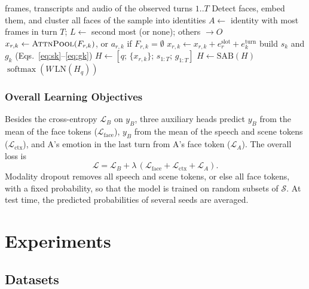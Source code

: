 \documentclass[11pt]{article}
\newcommand{\model}{PartiSet}
\begin{document}
\begin{algorithm}[t]
\caption{\model{} forward pass for one sample}
\label{alg:rolenet}
\small
\begin{algorithmic}[1]
\Require frames, transcripts and audio of the observed turns $1..T$
\State Detect faces, embed them, and cluster all faces of the sample into identities
\State $A \gets$ identity with most frames in turn $T$; $L \gets$ second most (or none); others $\to O$
  \State $x_{r,k} \gets \textsc{AttnPool}(F_{r,k})$, or $a_{r,k}$ if $F_{r,k} = \emptyset$
  \State $x_{r,k} \gets x_{r,k} + e^{\text{slot}}_r + e^{\text{turn}}_k$
\EndFor
{} \State build $s_k$ and $g_k$ (Eqs.~\ref{eq:sk}--\ref{eq:gk}) \EndFor
\State $H \gets [q;\, \{x_{r,k}\};\, s_{1:T};\, g_{1:T}]$
 \State $H \gets \mathrm{SAB}(H)$ \EndFor
\State \Return $\operatorname{softmax}(W\,\mathrm{LN}(H_q))$
\end{algorithmic}
\end{algorithm}

\subsubsection{Overall Learning Objectives}

Besides the cross-entropy $\mathcal{L}_B$ on $y_B$, three auxiliary heads predict $y_B$ from the mean of the face
tokens ($\mathcal{L}_{\text{face}}$), $y_B$ from the mean of the speech and scene tokens ($\mathcal{L}_{\text{ctx}}$),
and A's emotion in the last turn from A's face token ($\mathcal{L}_{A}$). The overall loss is
\begin{equation}
\mathcal{L} = \mathcal{L}_B + \lambda\,(\mathcal{L}_{\text{face}} + \mathcal{L}_{\text{ctx}} + \mathcal{L}_{A}).
\end{equation}
Modality dropout \citep{neverova2016moddrop} removes all speech and scene tokens, or else all face tokens, with a
fixed probability, so that the model is trained on random subsets of $\mathcal{S}$. At test time, the predicted
probabilities of several seeds are averaged.

\section{Experiments}
\label{sec:experiments}

\subsection{Datasets}
\end{document}
